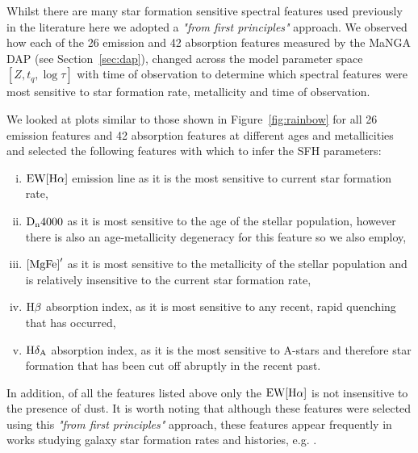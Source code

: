 \documentclass[useAMS,usenatbib]{mn2e}
\begin{document}
Whilst there are many star formation sensitive spectral features used previously in the literature \citep[see comprehensive review by][]{kennevans12} here we adopted a \emph{"from first principles"} approach. We observed how each of the 26 emission and 42 absorption features measured by the MaNGA DAP (see Section~\ref{sec:dap}), changed across the model parameter space $[Z, t_q, \log \tau]$ with time of observation to determine which spectral features were most sensitive to star formation rate, metallicity and time of observation. 

We looked at plots similar to those shown in Figure~\ref{fig:rainbow} for all 26 emission features and 42 absorption features at different ages and metallicities and selected the following features with which to infer the SFH parameters:
\begin{enumerate}[(i)]
\item $\rm{EW}[H\alpha]$ emission line as it is the most sensitive to current star formation rate,


\item $\rm{D}_n4000$ as it is most sensitive to the age of the stellar population, however there is also an age-metallicity degeneracy for this feature so we also employ,

\item $\rm{[MgFe]}^{\prime}$ as it is most sensitive to the metallicity of the stellar population and is relatively insensitive to the current star formation rate,

\item $\rm{H}\beta$ absorption index, as it is most sensitive to any recent, rapid quenching that has occurred,

\item $\rm{H}\delta_A$ absorption index, as it is the most sensitive to A-stars and therefore star formation that has been cut off abruptly in the recent past.


\end{enumerate}

In addition, of all the features listed above only the $\rm{EW}[H\alpha]$ is not insensitive to the presence of dust. It is worth noting that although these features were selected using this \emph{"from first principles"} approach, these features appear frequently in works studying galaxy star formation rates and histories, e.g. \cite{kauffmann03}.
\end{document}
